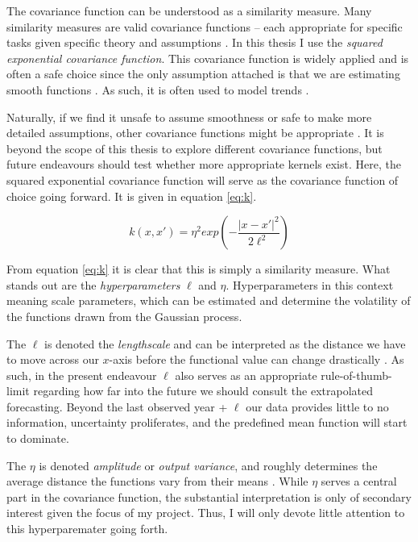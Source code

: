 \documentclass[a4paper]{article}
\begin{document}
The covariance function can be understood as a similarity measure. Many similarity measures are valid covariance functions -- each appropriate for specific tasks given specific theory and assumptions \citep[79]{williams2006gaussian}. In this thesis I use the \emph{squared exponential covariance function}. This covariance function is widely applied and is often a safe choice since the only assumption attached is that we are estimating smooth functions \citep[84]{williams2006gaussian}. As such, it is often used to model trends \cite[119]{williams2006gaussian}.\par 


Naturally, if we find it unsafe to assume smoothness or safe to make more detailed assumptions, other covariance functions might be appropriate \citep[502-503]{Gelman_2013}. It is beyond the scope of this thesis to explore different covariance functions, but future endeavours should test whether more appropriate kernels exist. Here, the squared exponential covariance function will serve as the covariance function of choice going forward. It is given in equation \ref{eq:k}.\par

\[
k(x,x') = \eta^2 exp\left(-\frac{|x-x'|^2}{2\ell^2}\right) \tag{7} \label{eq:k}
\]

From equation \ref{eq:k} it is clear that this is simply a similarity measure. What stands out are the \emph{hyperparameters} $\ell$ and $\eta$. Hyperparameters in this context meaning scale parameters, which can be estimated and determine the volatility of the functions drawn from the Gaussian process.\par

The $\ell$ is denoted the \emph{lengthscale} \cite[501-502]{Gelman_2013} and can be interpreted as the distance we have to move across our $x$-axis before the functional value can change drastically \citep[14-15]{williams2006gaussian}. As such, in the present endeavour $\ell$ also serves as an appropriate rule-of-thumb-limit regarding how far into the future we should consult the extrapolated forecasting. Beyond the last observed year + $\ell$ our data provides little to no information, uncertainty proliferates, and the predefined mean function will start to dominate.\par

The $\eta$ is denoted \emph{amplitude} or \emph{output variance}, and roughly determines the average distance the functions vary from their means \cite[502]{Gelman_2013}. While $\eta$ serves a central part in the covariance function, the substantial interpretation is only of secondary interest given the focus of my project. Thus, I will only devote little attention to this hyperparemater going forth.\par
\end{document}
